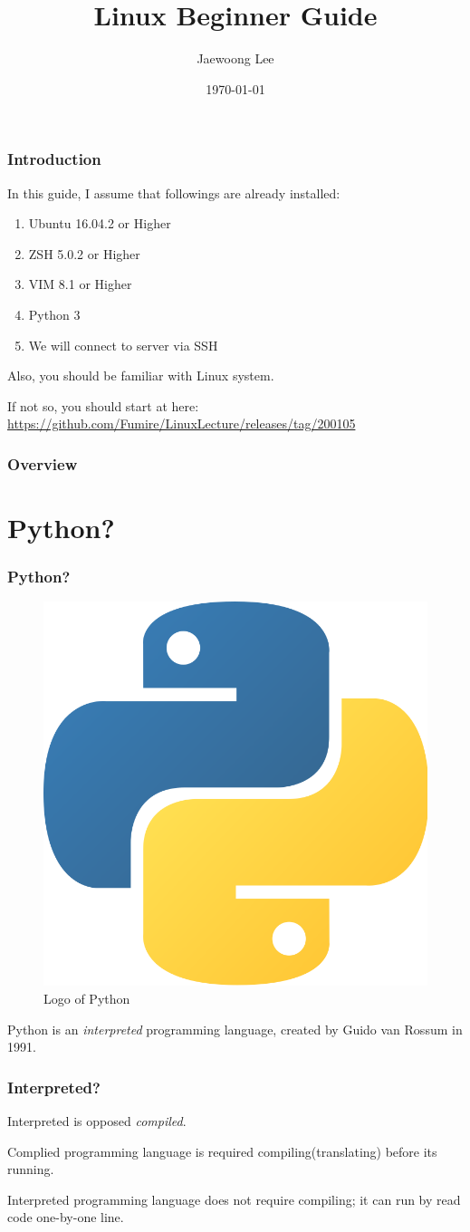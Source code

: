 \documentclass{beamer}
\title{Linux Beginner Guide}
\author{Jaewoong Lee}
\institute[UNIST]
{
	Ulsan National Institute of Science and Technology
	\medskip
	\newline
	\textit{jwlee230@unist.ac.kr}
}
\date{\today}
\begin{document}
	\begin{frame}
		\titlepage
	\end{frame}

	\begin{frame}
		\frametitle{Introduction}
		
		In this guide, I assume that followings are already installed:
		\begin{enumerate}
			\item Ubuntu 16.04.2 or Higher
			\item ZSH 5.0.2 or Higher
			\item VIM 8.1 or Higher
			\item Python 3
			\item We will connect to server via SSH
		\end{enumerate}
	
		Also, you should be familiar with Linux system. 
		
		If not so, you should start at here: \url{https://github.com/Fumire/LinuxLecture/releases/tag/200105}
	\end{frame}

	\begin{frame}
		\frametitle{Overview}
		\tableofcontents
	\end{frame}

	\section{Python?}
	\begin{frame}
		\frametitle{Python?}
		
		\begin{figure}
			\centering
			\includegraphics[width=0.2 \linewidth]{figures/python.png}
			\caption{Logo of Python}
		\end{figure}
	
		Python is an \textit{interpreted} programming language, created by Guido van Rossum in 1991. 
	\end{frame}

	\begin{frame}
		\frametitle{Interpreted?}
		
		Interpreted is opposed \textit{compiled}.
		
		Complied programming language is required compiling(translating) before its running. 
		
		Interpreted programming language does not require compiling; it can run by read code one-by-one line. 
	\end{frame}
\end{document}
